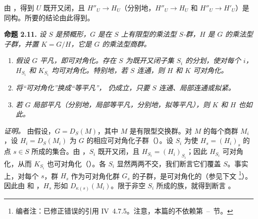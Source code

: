 由 ，得到 \(U\) 既开又闭，且 \(H''_U\to H_U\)（分别地，\(H''_U\to H_U\) 和 \(H''_U\to H'_U\)）是同构。所要的结论由此得到。

\medskip
\noindent{}\textbf{命题 2.11.}
\textit{设 \(S\) 是预概形，\(G\) 是在 \(S\) 上有限型的乘法型 \(S\)-群，\(H\) 是 \(G\) 的乘法型子群，并置 \(K=G/H\)，它是 \(G\) 的乘法型商群。}
\begin{enumerate}
  \item[(i)]
  \textit{假设 \(G\) 平凡，即可对角化。存在 \(S\) 为既开又闭子集 \(S_i\) 的分划，使对每个 \(i\)，\(H_{S_i}\) 和 \(K_{S_i}\) 均可对角化。特别地，若 \(S\) 连通，则 \(H\) 和 \(K\) 可对角化。}

  \item[(ii)]
  \textit{将“可对角化”换成“等平凡”， 仍成立，只要 \(S\) 连通、局部连通或拟紧。}

  \item[(iii)]
  \textit{若 \(G\) 局部平凡（分别地，局部等平凡，分别地，拟等平凡），则 \(K\) 和 \(H\) 也如此。}
\end{enumerate}

\emph{证明。}
 由假设，\(G=D_S(M)\)，其中 \(M\) 是有限型交换群。对 \(M\) 的每个商群 \(M_i\)，设 \(H_i=D_S(M_i)\) 为 \(G\) 的相应可对角化子群（）。设 \(S_i\) 为使 \(H_s=(H_i)_s\) 的点 \(s\in S\) 所成的集合。由 ，\(S_i\) 既开又闭，且 \(H_{S_i}=(H_i)_{S_i}\)；因此 \(H_{S_i}\) 可对角化，从而 \(K_{S_i}\) 也可对角化（）。各 \(S_i\) 显然两两不交，我们断言它们覆盖 \(S\)。事实上，对每个 \(s\)，群 \(H_s\) 作为可对角化群 \(G_s\) 的子群，是可对角化的（参见下文 \footnote{编者注：已修正错误的引用 IV~4.7.5。注意，本篇的不依赖第~--~节。}）。因此由  和 ，\(H_s\) 形如 \(D_{\kappa(s)}(M_i)\)。限于非空 \(S_i\) 所成的族，就得到断言 。

